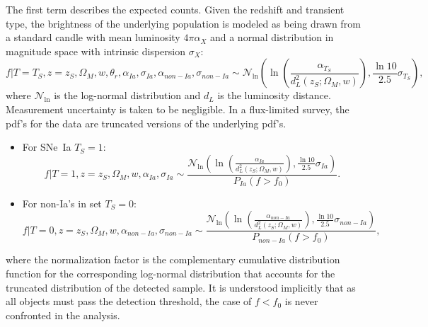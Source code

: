 \documentclass[preprint,3p]{elsarticle}
\begin{document}
The first term describes the expected counts. Given the redshift
and transient type, the brightness of the underlying population
is modeled as being drawn from a standard candle
with mean luminosity $4\pi\alpha_X$ and a normal distribution in magnitude
space with intrinsic dispersion  $\sigma_X$:
\begin{equation}
f| T=T_S, z=z_S, \Omega_M, w, \theta_r, \alpha_{Ia},\sigma_{Ia}, \alpha_{\mathit{non-Ia}},\sigma_{\mathit{non-Ia}} \sim \mathcal{N}_{\ln}\left(\ln{\left(\frac{\alpha_{T_S}}{d_L^2(z_S;\Omega_M, w)}\right)}, \frac{\ln{10}}{2.5}\sigma_{T_S}\right),
\label{flux:eqn}
\end{equation}
where $\mathcal{N}_{\ln}$ is the log-normal distribution and $d_L$ is the luminosity distance.
Measurement uncertainty is taken to be negligible.
In a flux-limited survey, the pdf's for the data are truncated versions of the underlying
pdf's.
\begin{itemize}
\item For SNe~Ia  $T_S=1$:
\begin{equation}
f | T=1, z=z_S, \Omega_M, w, \alpha_{Ia},\sigma_{Ia} \sim
\frac{\mathcal{N}_{\ln}\left(\ln{\left(\frac{\alpha_{Ia}}{d_L^2(z_S;\Omega_M, w)}\right)}, \frac{\ln{10}}{2.5}\sigma_{Ia}\right)}{P_{Ia}(f > f_0)}.
\label{adusnIa:eqn}
\end{equation}
\item For non-Ia's in set $T_S=0$:
\begin{equation}
f | T=0, z=z_S, \Omega_M, w, \alpha_{\mathit{non-Ia}},\sigma_{\mathit{non-Ia}}\sim 
\frac{\mathcal{N}_{\ln}\left(\ln{\left(\frac{\alpha_{\mathit{non-Ia}}}{d_L^2(z_S;\Omega_M, w)}\right)}, \frac{\ln{10}}{2.5}\sigma_{\mathit{non-Ia}}\right)}{P_{non-Ia}(f > f_0)},
\label{adunonIa:eqn}
\end{equation}
\end{itemize}
where the normalization factor is the complementary cumulative distribution function
for the corresponding log-normal distribution that accounts for the truncated
distribution of the detected sample.
It is understood implicitly that as all objects must pass the detection threshold,
the case of $f<f_0$ is never confronted in the analysis.
\end{document}
